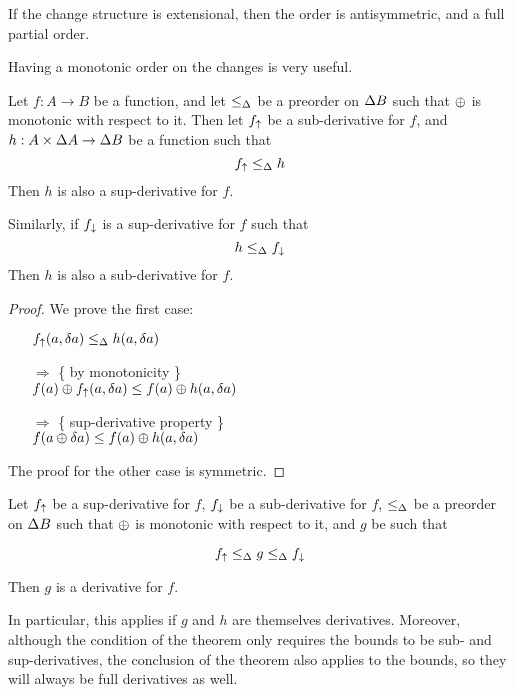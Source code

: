 If the change structure is extensional, then the order is antisymmetric, and a
full partial order.

Having a monotonic order on the changes is very useful.

\begin{thm}
  Let $f: A \rightarrow B$ be a function, and let $\leq_\Delta$ be a preorder on $\Delta B$ such that $\oplus$ is monotonic with
  respect to it. Then let $f_\uparrow$ be a sub-derivative for $f$, and $h: A \times
  \Delta A \rightarrow \Delta B$ be a function such that
  $$f_\uparrow \leq_\Delta h$$
  Then $h$ is also a sup-derivative for $f$.

  Similarly, if $f_\downarrow$ is a sup-derivative for $f$ such that 
  $$h \leq_\Delta f_\downarrow$$
  Then $h$ is also a sub-derivative for $f$.
\end{thm}
\begin{proof}
  We prove the first case:
  \begin{itemize}
    \item[ ]$f_\uparrow(a, \delta a) \leq_\Delta h(a, \delta a)$
    \item[$\Rightarrow$]\{ by monotonicity \}\\
      $f(a) \oplus f_\uparrow(a, \delta a) \leq f(a) \oplus h(a, \delta a)$
    \item[$\Rightarrow$]\{ sup-derivative property \}\\
      $f(a \oplus \delta a) \leq f(a) \oplus h(a, \delta a)$
  \end{itemize}

  The proof for the other case is symmetric.
\end{proof}

\begin{thm}
  \label{thm:sandwich}
  Let $f_\uparrow$ be a sup-derivative for $f$, $f_\downarrow$ be a sub-derivative for $f$, $\leq_\Delta$ be a preorder on $\Delta B$ such that $\oplus$ is monotonic with
  respect to it, and $g$ be such that

  $$f_\uparrow \leq_\Delta g \leq_\Delta f_\downarrow$$

  Then $g$ is a derivative for $f$.
\end{thm}

In particular, this applies if $g$ and $h$ are themselves derivatives. Moreover,
although the condition of the theorem only requires the bounds to be sub- and
sup-derivatives, the conclusion of the theorem also applies to the bounds, so
they will always be full derivatives as well.

